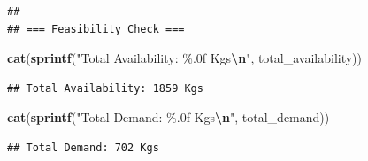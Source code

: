\documentclass[
]{article}
\newenvironment{Shaded}{\begin{snugshade}}{\end{snugshade}}
\newcommand{\FunctionTok}[1]{\textcolor[rgb]{0.13,0.29,0.53}{\textbf{#1}}}
\newcommand{\NormalTok}[1]{#1}
\newcommand{\SpecialCharTok}[1]{\textcolor[rgb]{0.81,0.36,0.00}{\textbf{#1}}}
\newcommand{\StringTok}[1]{\textcolor[rgb]{0.31,0.60,0.02}{#1}}
\begin{document}
\begin{verbatim}
## 
## === Feasibility Check ===
\end{verbatim}

\begin{Shaded}
\begin{Highlighting}[]
\FunctionTok{cat}\NormalTok{(}\FunctionTok{sprintf}\NormalTok{(}\StringTok{"Total Availability: \%.0f Kgs}\SpecialCharTok{\textbackslash{}n}\StringTok{"}\NormalTok{, total\_availability))}
\end{Highlighting}
\end{Shaded}

\begin{verbatim}
## Total Availability: 1859 Kgs
\end{verbatim}

\begin{Shaded}
\begin{Highlighting}[]
\FunctionTok{cat}\NormalTok{(}\FunctionTok{sprintf}\NormalTok{(}\StringTok{"Total Demand: \%.0f Kgs}\SpecialCharTok{\textbackslash{}n}\StringTok{"}\NormalTok{, total\_demand))}
\end{Highlighting}
\end{Shaded}

\begin{verbatim}
## Total Demand: 702 Kgs
\end{verbatim}
\end{document}
